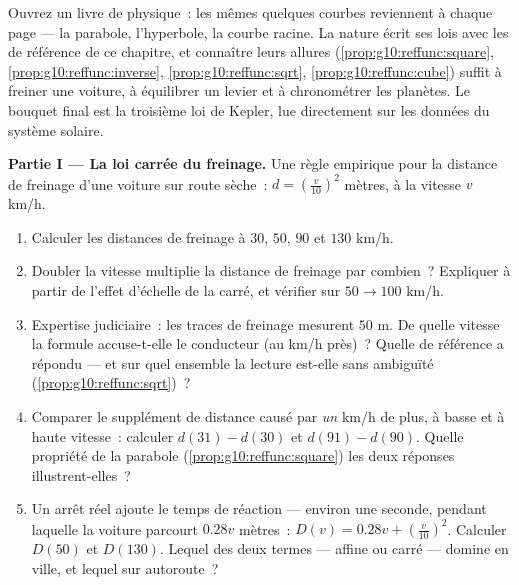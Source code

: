 \begin{problem}
\label{pb:g10:reffunc:1}
Ouvrez un livre de physique~: les mêmes quelques courbes reviennent à
chaque page --- la parabole, l'hyperbole, la courbe racine. La nature
écrit ses lois avec les  de référence de ce chapitre, et
connaître leurs allures (\cref{prop:g10:reffunc:square},
\cref{prop:g10:reffunc:inverse}, \cref{prop:g10:reffunc:sqrt},
\cref{prop:g10:reffunc:cube}) suffit à freiner une voiture, à
équilibrer un levier et à chronométrer les planètes. Le bouquet final
est la troisième loi de Kepler, lue directement sur les données du
système solaire.

\medskip
\noindent\textbf{Partie I --- La loi carrée du freinage.}
Une règle empirique pour la distance de freinage d'une voiture sur
route sèche~: $d = \left(\frac{v}{10}\right)^{2}$ mètres, à la vitesse
$v$ km/h.
\begin{enumerate}
  \item Calculer les distances de freinage à $30$, $50$, $90$ et
        $130$ km/h.
  \item Doubler la vitesse multiplie la distance de freinage par
        combien~? Expliquer à partir de l'effet d'échelle de la
         carré, et vérifier sur $50 \to 100$ km/h.
  \item Expertise judiciaire~: les traces de freinage mesurent
        $50$ m. De quelle vitesse la formule accuse-t-elle le
        conducteur (au km/h près)~? Quelle  de référence a
        répondu --- et sur quel ensemble la lecture est-elle sans
        ambiguïté (\cref{prop:g10:reffunc:sqrt})~?
  \item Comparer le supplément de distance causé par \emph{un} km/h
        de plus, à basse et à haute vitesse~: calculer
        $d(31) - d(30)$ et $d(91) - d(90)$. Quelle propriété de la
        parabole (\cref{prop:g10:reffunc:square}) les deux réponses
        illustrent-elles~?
  \item Un arrêt réel ajoute le temps de réaction --- environ une
        seconde, pendant laquelle la voiture parcourt $0.28v$
        mètres~: $D(v) = 0.28v + \left(\frac{v}{10}\right)^2$.
        Calculer $D(50)$ et $D(130)$. Lequel des deux termes ---
        affine ou carré --- domine en ville, et lequel sur
        autoroute~?
\end{enumerate}


\end{problem}
